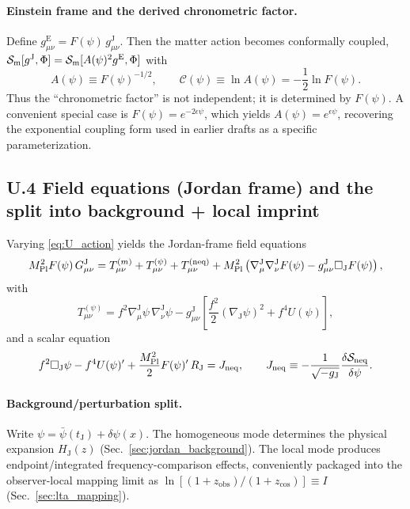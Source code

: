 \documentclass[10pt]{article}
\newcommand{\zobs}{z_{\mathrm{obs}}}
\newcommand{\zcos}{z_{\mathrm{cos}}}
\newcommand{\gJ}{g^{\mathrm{J}}}        %
\newcommand{\gE}{g^{\mathrm{E}}}        %
\newcommand{\HJ}{H_{\mathrm{J}}}
\newcommand{\tJ}{t_{\mathrm{J}}}
\newcommand{\Mp}{M_{\mathrm{Pl}}}
\newcommand{\Fpsi}{F(\psi)}
\newcommand{\Upsi}{U(\psi)}
\newcommand{\Apsi}{A(\psi)}
\newcommand{\Cpsi}{\mathcal{C}(\psi)} %
\begin{document}
\paragraph{Einstein frame and the derived chronometric factor.}
Define \(\gE_{\mu\nu}=\Fpsi\,\gJ_{\mu\nu}\). Then the matter action becomes conformally coupled,
\(\mathcal{S}_{\rm m}[\gJ,\Phi]=\mathcal{S}_{\rm m}[\Apsi^2\gE,\Phi]\) with
\begin{equation}
\Apsi \equiv \Fpsi^{-1/2},
\qquad
\Cpsi \equiv \ln \Apsi = -\frac12\ln\Fpsi.
\end{equation}
Thus the ``chronometric factor'' is not independent; it is determined by \(F(\psi)\).
A convenient special case is \(F(\psi)=e^{-2\epsilon\psi}\), which yields \(\Apsi=e^{\epsilon\psi}\),
recovering the exponential coupling form used in earlier drafts as a specific parameterization.

\subsection{U.4 Field equations (Jordan frame) and the split into background + local imprint}
\label{app:unified:field_eqs}

Varying \eqref{eq:U_action} yields the Jordan-frame field equations
\begin{equation}
\Mp^{2}\Fpsi\,G^{\mathrm{J}}_{\mu\nu}
=
T^{(m)}_{\mu\nu}
+
T^{(\psi)}_{\mu\nu}
+
T^{(\rm neq)}_{\mu\nu}
+
\Mp^{2}\left(\nabla^{\mathrm{J}}_{\mu}\nabla^{\mathrm{J}}_{\nu}\Fpsi - \gJ_{\mu\nu}\Box_{\mathrm{J}}\Fpsi\right),
\end{equation}
with
\begin{equation}
T^{(\psi)}_{\mu\nu}
=
f^{2}\nabla^{\mathrm{J}}_{\mu}\psi\,\nabla^{\mathrm{J}}_{\nu}\psi
-
\gJ_{\mu\nu}\left[\frac{f^{2}}{2}(\nabla_{\mathrm{J}}\psi)^2+f^{4}\Upsi\right],
\end{equation}
and a scalar equation
\begin{equation}
f^{2}\Box_{\mathrm{J}}\psi - f^{4}\Upsi' + \frac{\Mp^{2}}{2}\Fpsi'\,R_{\mathrm{J}}
=
J_{\rm neq},
\qquad
J_{\rm neq}\equiv -\frac{1}{\sqrt{-g_{\mathrm{J}}}}\frac{\delta \mathcal{S}_{\rm neq}}{\delta\psi}.
\label{eq:U_scalar_eom}
\end{equation}

\paragraph{Background/perturbation split.}
Write \(\psi=\bar\psi(\tJ)+\delta\psi(x)\). The homogeneous mode determines the physical expansion
\(\HJ(z)\) (Sec.~\ref{sec:jordan_background}). The local mode produces endpoint/integrated
frequency-comparison effects, conveniently packaged into the observer-local mapping limit as
\(\ln[(1+\zobs)/(1+\zcos)]\equiv I\) (Sec.~\ref{sec:lta_mapping}).
\end{document}
